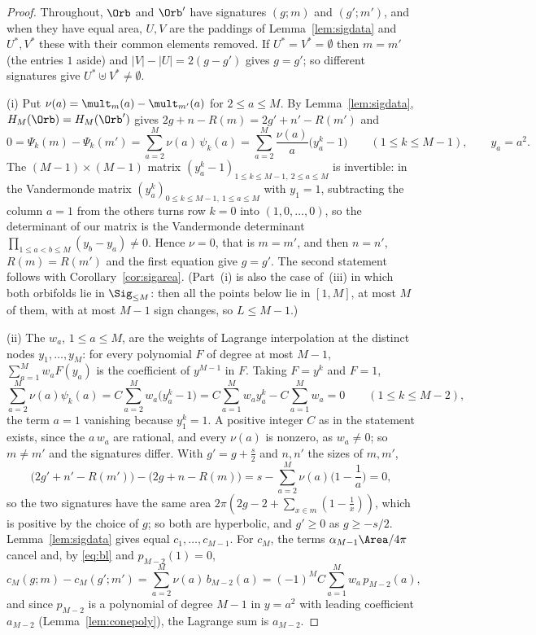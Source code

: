 \begin{proof}
Throughout, $\Orb$ and $\Orb'$ have signatures $(g;m)$ and $(g';m')$, and when they have equal area, $U,V$ are the paddings of Lemma~\ref{lem:sigdata} and $U^*,V^*$ these with their common elements removed. If $U^*=V^*=\emptyset$ then $m=m'$ (the entries $1$ aside) and $|V|-|U|=2(g-g')$ gives $g=g'$; so different signatures give $U^*\uplus V^*\ne\emptyset$.

(i) Put $\nu(a)=\mult_m(a)-\mult_{m'}(a)$ for $2\le a\le M$. By Lemma~\ref{lem:sigdata}, $H_M(\Orb)=H_M(\Orb')$ gives $2g+n-R(m)=2g'+n'-R(m')$ and
\[
  0=\Psi_k(m)-\Psi_k(m')=\sum_{a=2}^M\nu(a)\,\psi_k(a)=\sum_{a=2}^M\frac{\nu(a)}a\big(y_a^k-1\big)\qquad(1\le k\le M-1),\qquad y_a=a^2 .
\]
The $(M-1)\times(M-1)$ matrix $(y_a^k-1)_{1\le k\le M-1,\ 2\le a\le M}$ is invertible: in the Vandermonde matrix $(y_a^k)_{0\le k\le M-1,\ 1\le a\le M}$ with $y_1=1$, subtracting the column $a=1$ from the others turns row $k=0$ into $(1,0,\dots,0)$, so the determinant of our matrix is the Vandermonde determinant $\prod_{1\le a<b\le M}(y_b-y_a)\ne0$. Hence $\nu=0$, that is $m=m'$, and then $n=n'$, $R(m)=R(m')$ and the first equation give $g=g'$. The second statement follows with Corollary~\ref{cor:sigarea}. (Part~(i) is also the case of~(iii) in which both orbifolds lie in $\Sig_{\le M}$: then all the points below lie in $[1,M]$, at most $M$ of them, with at most $M-1$ sign changes, so $L\le M-1$.)

(ii) The $w_a$, $1\le a\le M$, are the weights of Lagrange interpolation at the distinct nodes $y_1,\dots,y_M$: for every polynomial $F$ of degree at most $M-1$, $\sum_{a=1}^Mw_aF(y_a)$ is the coefficient of $y^{M-1}$ in $F$. Taking $F=y^k$ and $F=1$,
\[
  \sum_{a=2}^M\nu(a)\psi_k(a)=C\sum_{a=2}^Mw_a\big(y_a^k-1\big)=C\sum_{a=1}^Mw_ay_a^k-C\sum_{a=1}^Mw_a=0\qquad(1\le k\le M-2),
\]
the term $a=1$ vanishing because $y_1^k=1$. A positive integer $C$ as in the statement exists, since the $a\,w_a$ are rational, and every $\nu(a)$ is nonzero, as $w_a\ne0$; so $m\ne m'$ and the signatures differ. With $g'=g+\frac s2$ and $n,n'$ the sizes of $m,m'$,
\[
  \big(2g'+n'-R(m')\big)-\big(2g+n-R(m)\big)=s-\sum_{a=2}^M\nu(a)\Big(1-\frac1a\Big)=0,
\]
so the two signatures have the same area $2\pi(2g-2+\sum_{x\in m}(1-\frac1x))$, which is positive by the choice of $g$; so both are hyperbolic, and $g'\ge0$ as $g\ge-s/2$. Lemma~\ref{lem:sigdata} gives equal $c_1,\dots,c_{M-1}$. For $c_M$, the terms $\alpha_{M-1}\Area/4\pi$ cancel and, by \eqref{eq:bl} and $p_{M-2}(1)=0$,
\[
  c_M(g;m)-c_M(g';m')=\sum_{a=2}^M\nu(a)\,b_{M-2}(a)=(-1)^MC\sum_{a=1}^Mw_a\,p_{M-2}(a),
\]
and since $p_{M-2}$ is a polynomial of degree $M-1$ in $y=a^2$ with leading coefficient $a_{M-2}$ (Lemma~\ref{lem:conepoly}), the Lagrange sum is $a_{M-2}$.


\end{proof}
